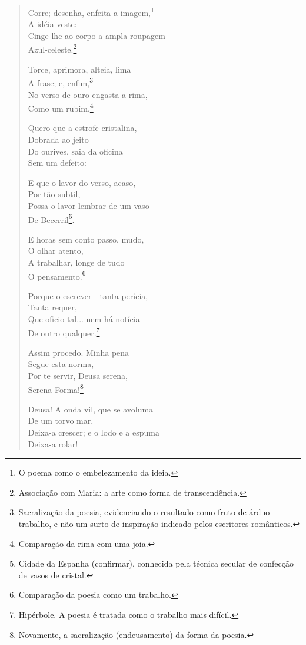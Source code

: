 \begin{verse}
Corre; desenha, enfeita a imagem,\footnote{O poema como o embelezamento da ideia.} \\
A idéia veste: \\
Cinge-lhe ao corpo a ampla roupagem \\
Azul-celeste.\footnote{Associação com Maria: a arte como forma de transcendência.}

Torce, aprimora, alteia, lima \\
A frase; e, enfim,\footnote{Sacralização da poesia, evidenciando o resultado como fruto de árduo trabalho, e não um surto de inspiração indicado pelos escritores românticos.} \\
No verso de ouro engasta a rima, \\
Como um rubim.\footnote{Comparação da rima com uma joia.}

Quero que a estrofe cristalina, \\
Dobrada ao jeito \\
Do ourives, saia da oficina \\
Sem um defeito:

E que o lavor do verso, acaso, \\
Por tão subtil, \\
Possa o lavor lembrar de um vaso \\
De Becerril\footnote{Cidade da Espanha (confirmar), conhecida pela técnica secular de confecção de vasos de cristal.}.

E horas sem conto passo, mudo, \\
O olhar atento, \\
A trabalhar, longe de tudo \\
O pensamento.\footnote{Comparação da poesia como um trabalho.}

Porque o escrever - tanta perícia, \\
Tanta requer, \\
Que oficio tal... nem há notícia \\
De outro qualquer.\footnote{Hipérbole. A poesia é tratada como o trabalho mais difícil.}

Assim procedo. Minha pena \\
Segue esta norma, \\
Por te servir, Deusa serena, \\
Serena Forma!\footnote{Novamente, a sacralização (endeusamento) da forma da poesia.}

Deusa! A onda vil, que se avoluma \\
De um torvo mar, \\
Deixa-a crescer; e o lodo e a espuma \\
Deixa-a rolar!


\end{verse}
